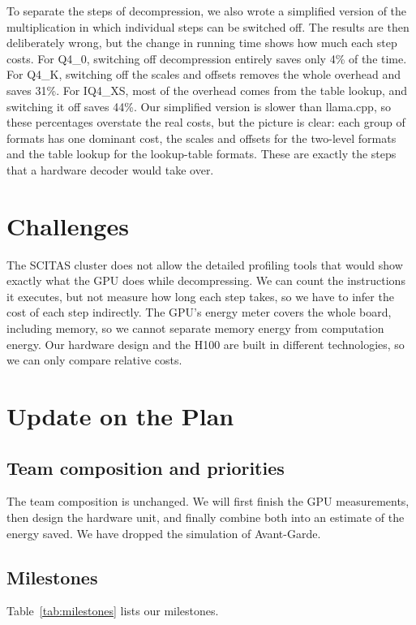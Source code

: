 \documentclass[10pt,twocolumn,letterpaper]{article}
\begin{document}
To separate the steps of decompression, we also wrote a simplified version of the multiplication in which
individual steps can be switched off. The results are then deliberately wrong, but the change in running time shows
how much each step costs. For Q4\_0, switching off decompression entirely saves only 4\% of the time. For Q4\_K,
switching off the scales and offsets removes the whole overhead and saves 31\%. For IQ4\_XS, most of the overhead
comes from the table lookup, and switching it off saves 44\%. Our simplified version is slower than llama.cpp, so
these percentages overstate the real costs, but the picture is clear: each group of formats has one dominant cost,
the scales and offsets for the two-level formats and the table lookup for the lookup-table formats. These are
exactly the steps that a hardware decoder would take over.

\section{Challenges}
The SCITAS cluster does not allow the detailed profiling tools that would show exactly what the GPU does while
decompressing. We can count the instructions it executes, but not measure how long each step takes, so we have to
infer the cost of each step indirectly. The GPU's energy meter covers the whole board, including memory,
so we cannot separate memory energy from computation energy. Our hardware design and the H100 are built in different
technologies, so we can only compare relative costs.

\section{Update on the Plan}

\subsection{Team composition and priorities}
The team composition is unchanged. We will first finish the GPU measurements, then design the hardware unit, and
finally combine both into an estimate of the energy saved. We have dropped the simulation of Avant-Garde.

\subsection{Milestones}
Table~\ref{tab:milestones} lists our milestones.
\end{document}
